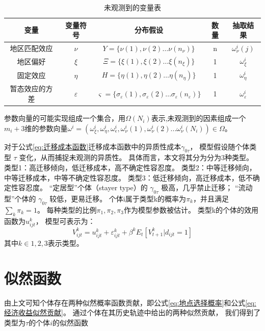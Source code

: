 \documentclass[a4paper,12pt,oneside, fontset=mac]{ctexbook} %
\begin{document}
\begin{table}[!ht]
\centering
\caption{未观测到的变量表}
\label{tab:未观测到的变量表}
\begin{tabular}{@{}ccccc@{}}
\toprule
变量 & 变量符号 & 分布假设 & 数量 & 抽取结果 \\ \midrule
地区匹配效应 & $\nu$ & $Y=\{\nu(1),\nu(2)\ldots\nu(n_{\nu})\}$ & n & $\omega^{i}_{\nu}(j)$\\
地区偏好 & $\xi$ & $\Xi=\{\xi(1),\xi(2)\ldots\xi(n_{\xi})\}$ & 1 & $\omega^{i}_{\xi}$ \\
固定效应 & $\eta$ & $H=\{\eta(1),\eta(2)\ldots\eta(n_\eta)\}$ & 1 & $\omega^{i}_{\eta}$ \\
暂态效应的方差 & $\varepsilon$ & $\varsigma=\{\sigma_{\varepsilon}(1),\sigma_{\varepsilon}(2)\ldots\sigma_{\varepsilon}(n_{\varepsilon})\}$ & 1 & $\omega^{i}_{\varepsilon}$ \\ \bottomrule
\end{tabular}
\end{table}


参数向量的可能实现组成一个集合，用$\Omega(N_{i})$表示,未观测到的因素组成一个$m_{i}+3$维的参数向量$\omega^{i}=(\omega^{i}_{\xi},\omega^{i}_{\eta},\omega^{i}_{\epsilon},\omega^{i}_{\nu}(1),\omega^{i}_{\nu}(2)...\omega^{i}_{\nu}(N_{i}))\in \Omega$。


对于公式\ref{eq:迁移成本函数}迁移成本函数中的异质性成本$\gamma_{0\tau}$，
模型假设随个体类型 $\tau$ 变化，从而捕捉未观测的异质性。
具体而言，本文将其分为分为3种类型。
类型1：高迁移倾向，低迁移成本，高不确定性容忍度。
类型2：中等迁移倾向，中等迁移成本，中等不确定性容忍度。
类型3：低迁移倾向，高迁移成本，低不确定性容忍度。
“定居型”个体（stayer type）的 $\gamma_{0\tau}$ 极高，几乎禁止迁移；
“流动型”个体的 $\gamma_{0\tau}$ 较低，更易迁移。
个体i属于类型k的概率为$\pi_k$，并且满足$\sum\limits_{k}^{} \pi_k = 1$。
每种类型的比例$\pi_1, \pi_2, \pi_3$作为模型参数被估计。
类型k的个体的效用函数为$u_{ijt}^k$，
模型可表示为：
$$V_{ijt}^k = u_{ijt}^k + \varepsilon_{ijt}^k + \beta^k E_t[V_{t+1}^k|d_{ijt}=1]$$
其中$k\in{1,2,3}$表示类型。


\section{似然函数}




由上文可知个体存在两种似然概率函数贡献，即公式\ref{eq:地点选择概率}和公式\ref{eq:经济收益似然贡献}。
通过个体在其历史轨迹中给出的两种似然贡献，
我们得到了类型为$\tau$的个体$i$的似然函数
\end{document}
